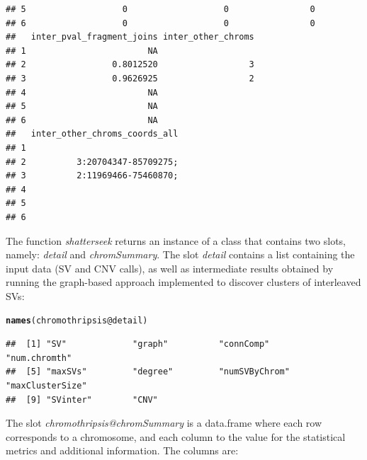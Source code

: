 \documentclass[twoside,a4wide,11pt]{article}\usepackage[]{graphicx}\usepackage[]{color}
\makeatletter
\newcommand{\hlopt}[1]{\textcolor[rgb]{0,0,0}{#1}}%
\newcommand{\hlstd}[1]{\textcolor[rgb]{0.345,0.345,0.345}{#1}}%
\newcommand{\hlkwc}[1]{\textcolor[rgb]{0.333,0.667,0.333}{#1}}%
\newcommand{\hlkwd}[1]{\textcolor[rgb]{0.737,0.353,0.396}{\textbf{#1}}}%
\newenvironment{kframe}{%
 \def\at@end@of@kframe{}%
 \ifinner\ifhmode%
  \def\at@end@of@kframe{\end{minipage}}%
  \begin{minipage}{\columnwidth}%
 \fi\fi%
 \def\FrameCommand##1{\hskip\@totalleftmargin \hskip-\fboxsep
 \colorbox{shadecolor}{##1}\hskip-\fboxsep
     \hskip-\linewidth \hskip-\@totalleftmargin \hskip\columnwidth}%
 \MakeFramed {\advance\hsize-\width
   \@totalleftmargin\z@ \linewidth\hsize
   \@setminipage}}%
 {\par\unskip\endMakeFramed%
 \at@end@of@kframe}
\newenvironment{knitrout}{}{} %
\makeatother
\begin{document}
\begin{knitrout}
\begin{kframe}
\begin{verbatim}
## 5                   0                   0                0
## 6                   0                   0                0
##   inter_pval_fragment_joins inter_other_chroms
## 1                        NA                   
## 2                 0.8012520                  3
## 3                 0.9626925                  2
## 4                        NA                   
## 5                        NA                   
## 6                        NA                   
##   inter_other_chroms_coords_all
## 1                              
## 2          3:20704347-85709275;
## 3          2:11969466-75460870;
## 4                              
## 5                              
## 6
\end{verbatim}
\end{kframe}
\end{knitrout}



The function {\it shatterseek} returns an instance of a class that contains two slots, namely:
{\it detail} and {\it chromSummary}. 
The slot {\it detail} contains a list containing the input data (SV and CNV calls), 
as well as intermediate results obtained by running the graph-based approach
implemented to discover clusters of interleaved SVs:
\begin{knitrout}
\color{fgcolor}\begin{kframe}
\begin{alltt}
\hlkwd{names}\hlstd{(chromothripsis}\hlopt{@}\hlkwc{detail}\hlstd{)}
\end{alltt}
\begin{verbatim}
##  [1] "SV"             "graph"          "connComp"       "num.chromth"   
##  [5] "maxSVs"         "degree"         "numSVByChrom"   "maxClusterSize"
##  [9] "SVinter"        "CNV"
\end{verbatim}
\end{kframe}
\end{knitrout}

The slot {\it chromothripsis@chromSummary} is a data.frame where each row corresponds to a chromosome,
and each column to the value for the statistical metrics and additional information.
The columns are:
\end{document}
